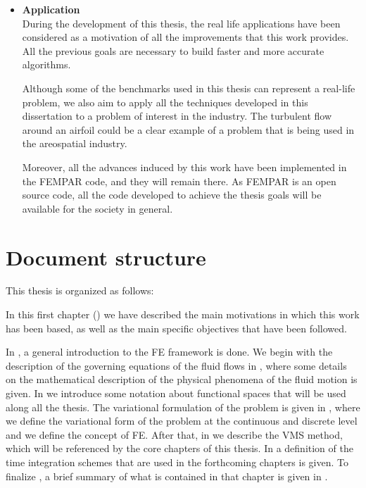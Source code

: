 \begin{itemize}
\item {\bf Application}\\
During the development of this thesis, the real life applications have been considered as a motivation of all the improvements that this work provides. All the previous goals are necessary to build faster and more accurate algorithms.

Although some of the benchmarks used in this thesis can represent a real-life problem, we also aim to apply all the techniques developed in this dissertation to a problem of interest in the industry. The turbulent flow around an airfoil could be a clear example of a problem that is being used in the areospatial industry.

Moreover, all the advances induced by this work have been implemented in the FEMPAR code, and they will remain there. As FEMPAR is an open source code, all the code developed to achieve the thesis goals will be available for the society in general.


\end{itemize}

\section{Document structure}

This thesis is organized as follows:

In this first chapter () we have described the main motivations in which this work has been based, as well as the main specific objectives that have been followed.

In , a general introduction to the FE framework is done. We begin with the description of the governing equations of the fluid flows in , where some details on the mathematical description of the physical phenomena of the fluid motion is given. In  we introduce some notation about functional spaces that will be used along all the thesis. The variational formulation of the problem is given in , where we define the variational form of the problem at the continuous and discrete level and we define the concept of FE. After that, in  we describe the VMS method, which will be referenced by the core chapters of this thesis. In  a definition of the time integration schemes that are used in the forthcoming chapters is given. To finalize , a brief summary of what is contained in that chapter is given in .

